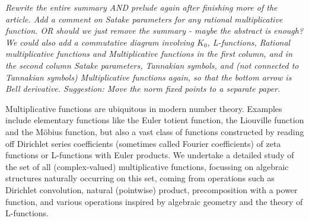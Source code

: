 \documentclass[a4paper]{article}
\theoremstyle{definition}
\theoremstyle{remark}
\newcommand{\C}{\mathbb{C}}
\begin{document}
{
}


\emph{Rewrite the entire summary AND prelude again after finishing more of the article. Add a comment on Satake parameters for any rational multiplicative function. OR should we just remove the summary - maybe the abstract is enough? We could also add a commutative diagram involving $K_0$, L-functions, Rational multiplicative functions and Multiplicative functions in the first column, and in the second column Satake parameters, Tannakian symbols, and (not connected to Tannakian symbols) Multiplicative functions again, so that the bottom arrow is Bell derivative. Suggestion: Move the norm fixed points to a separate paper.}

Multiplicative functions are ubiquitous in modern number theory. Examples include elementary functions like the Euler totient function, the Liouville function and the M\"obius function, but also a vast class of functions constructed by reading off Dirichlet series coefficients (sometimes called Fourier coefficients) of zeta functions or L-functions with Euler products. We undertake a detailed study of the set of all (complex-valued) multiplicative functions, focussing on algebraic structures naturally occurring on this set, coming from operations such as Dirichlet convolution, natural (pointwise) product, precomposition with a power function, and various operations inspired by algebraic geometry and the theory of L-functions. 
\end{document}
